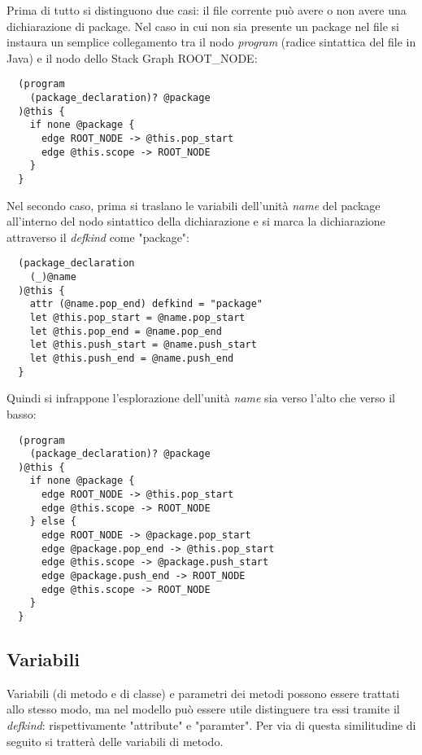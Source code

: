 Prima di tutto si distinguono due casi: il file corrente pu\`o avere o non avere una dichiarazione di package.
Nel caso in cui non sia presente un package nel file si instaura un semplice collegamento tra il nodo \emph{program} (radice sintattica del file in Java) e il nodo dello Stack Graph ROOT\_NODE:

\begin{lstlisting}
  (program
    (package_declaration)? @package
  )@this {
    if none @package {
      edge ROOT_NODE -> @this.pop_start
      edge @this.scope -> ROOT_NODE
    }
  }
\end{lstlisting}

Nel secondo caso, prima si traslano le variabili dell'unit\`a \emph{name} del package all'interno del nodo sintattico della dichiarazione e si marca la dichiarazione attraverso il \emph{defkind} come "package":

\begin{lstlisting}
  (package_declaration
    (_)@name
  )@this {
    attr (@name.pop_end) defkind = "package"
    let @this.pop_start = @name.pop_start
    let @this.pop_end = @name.pop_end
    let @this.push_start = @name.push_start
    let @this.push_end = @name.push_end
  }
\end{lstlisting}

Quindi si infrappone l'esplorazione dell'unit\`a \emph{name} sia verso l'alto che verso il basso:

\begin{lstlisting}
  (program
    (package_declaration)? @package
  )@this {
    if none @package {
      edge ROOT_NODE -> @this.pop_start
      edge @this.scope -> ROOT_NODE
    } else {
      edge ROOT_NODE -> @package.pop_start
      edge @package.pop_end -> @this.pop_start
      edge @this.scope -> @package.push_start
      edge @package.push_end -> ROOT_NODE
      edge @this.scope -> ROOT_NODE
    }
  }
\end{lstlisting}

\subsection{Variabili}

Variabili (di metodo e di classe) e parametri dei metodi possono essere trattati allo stesso modo, ma nel modello pu\`o essere utile distinguere tra essi tramite il \emph{defkind}: rispettivamente "attribute" e "paramter".
Per via di questa similitudine di seguito si tratter\`a delle variabili di metodo.

